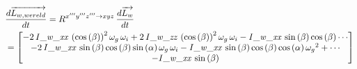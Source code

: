 \begin{equation*}
\begin{split}
&\frac{d\overrightarrow{L_{w,wereld}}}{dt}=R^{x'''y'''z''' \rightarrow xyz}\,\frac{d\overrightarrow{L_{w}}}{dt}\\
&=\begin{bmatrix}
-2\,{\it I\_w\_xx}\, \left( \cos \left( 
\beta \right)  \right) ^{2}\omega_{g}\,\omega_{i}+2\,{\it I\_w\_zz}\,
 \left( \cos \left( \beta \right)  \right) ^{2}\omega_{g}\,\omega_{i}-
{\it I\_w\_xx}\,\sin \left( \beta \right) \cos \left( \beta \right)\cdots 
\\ 
-2\,{\it I\_w\_xx}\,\sin \left( \beta \right) \cos \left( \beta
 \right) \sin \left( \alpha \right) \omega_{g}\,\omega_{i}-{\it 
I\_w\_xx}\,\sin \left( \beta \right) \cos \left( \beta \right) \cos
 \left( \alpha \right) {\omega_{g}}^{2}+\cdots
\\
-{\it I\_w\_xx}\,\sin \left( \beta \right) 

\end{bmatrix}
\end{split}
\end{equation*}
